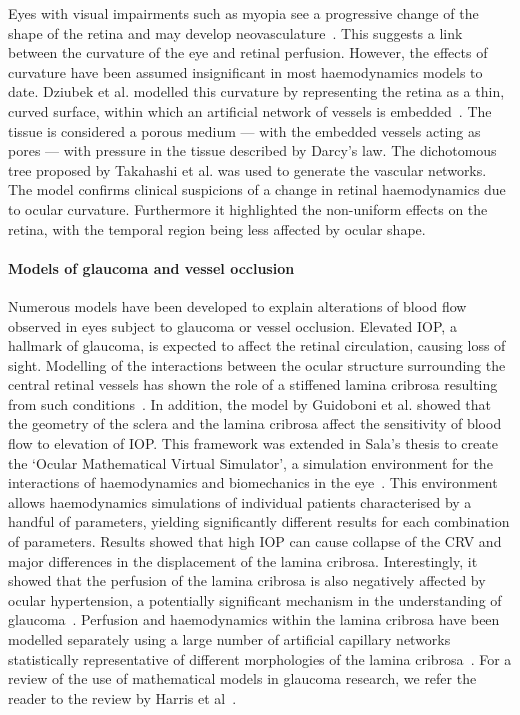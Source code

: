 \documentclass{article}
\begin{document}
Eyes with visual impairments such as myopia see a progressive change of the shape of the retina and may develop neovasculature~\cite{Medina_2016}.
This suggests a link between the curvature of the eye and retinal perfusion.
However, the effects of curvature have been assumed insignificant in most haemodynamics models to date.
Dziubek et al. modelled this curvature by representing the retina as a thin, curved surface, within which an artificial network of vessels is embedded~\cite{Dziubek_2015}.
The tissue is considered a porous medium --- with the embedded vessels acting as pores --- with pressure in the tissue described by Darcy's law.
The dichotomous tree proposed by Takahashi et al. was used to generate the vascular networks.
The model confirms clinical suspicions of a change in retinal haemodynamics due to ocular curvature.
Furthermore it highlighted the non-uniform effects on the retina, with the temporal region being less affected by ocular shape\cite{Dziubek_2015}.

\paragraph*{Models of glaucoma and vessel occlusion}

Numerous models have been developed to explain alterations of blood flow observed in eyes subject to glaucoma or vessel occlusion\cite{Chuangsuwanich_2016,Guidoboni_2014,Sala_2018,Sala_2020}.
Elevated IOP, a hallmark of glaucoma, is expected to affect the retinal circulation, causing loss of sight.
Modelling of the interactions between the ocular structure surrounding the central retinal vessels has shown the role of a stiffened lamina cribrosa resulting from such conditions~\cite{Guidoboni_2014}.
In addition, the model by Guidoboni et al. showed that the geometry of the sclera and the lamina cribrosa affect the sensitivity of blood flow to elevation of IOP.
This framework was extended in Sala's thesis to create the `Ocular Mathematical Virtual Simulator', a simulation environment for the interactions of haemodynamics and biomechanics in the eye~\cite{Sala_2018,Sala_2020}.
This environment allows haemodynamics simulations of individual patients characterised by a handful of parameters, yielding significantly different results for each combination of parameters.
Results showed that high IOP can cause collapse of the CRV and major differences in the displacement of the lamina cribrosa.
Interestingly, it showed that the perfusion of the lamina cribrosa is also negatively affected by ocular hypertension, a potentially significant mechanism in the understanding of glaucoma~\cite{Sala_2020}.
Perfusion and haemodynamics within the lamina cribrosa have been modelled separately using a large number of artificial capillary networks statistically representative of different morphologies of the lamina cribrosa~\cite{Chuangsuwanich_2016}.
For a review of the use of mathematical models in glaucoma research, we refer the reader to the review by Harris et al~\cite{Harris_2013}.
\end{document}

